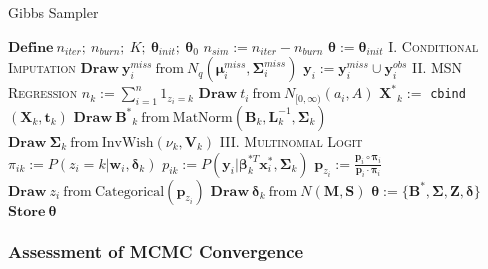 \documentclass[useAMS,referee]{biom}
\begin{document}
\begin{algorithm}
\caption{Gibbs Sampler}
\begin{algorithmic}
\small
\linespread{0.5}
    \State $\mathbf{Define} \ n_{iter};\  n_{burn}; \ K; \ \boldsymbol\theta_{init}; \ \boldsymbol\theta_0$
    \State $n_{sim} := n_{iter} - n_{burn}$
    \State $\boldsymbol\theta := \boldsymbol\theta_{init}$
        \State \textsc{I. Conditional Imputation}
            \State $\mathbf{Draw} \ \mathbf{y}_i^{miss} \ \text{from} \ N_q(\boldsymbol\mu_i^{miss}, \boldsymbol\Sigma_i^{miss})$
            \State $\mathbf{y}_i := \mathbf{y}_i^{miss} \cup \mathbf{y}_i^{obs}$
         \EndFor
        \State \textsc{II. MSN Regression}
            \State $n_k := \sum_{i = 1}^n {1}_{z_i = k}$
              \State $\mathbf{Draw}\  t_i \ \text{from} \ N_{[0,\infty)}(a_i,A)$
            \EndFor
            \State $\mathbf{X^*}_k := $ \texttt{cbind}$(\mathbf{X}_k,\mathbf{t}_k)$
            \State $\mathbf{Draw} \ \mathbf{B^*}_k \ \text{from} \ \text{MatNorm}(\mathbf{B}_k,\mathbf{L}_k^{-1},\boldsymbol\Sigma_k)$
            \State $\mathbf{Draw} \ \boldsymbol\Sigma_k \ \text{from} \ \text{InvWish}(\nu_k, \mathbf{V}_k)$
          \EndFor
        \State \textsc{III. Multinomial Logit}
              \State $\pi_{ik} := P(z_i = k|\mathbf{w}_i,\boldsymbol\delta_k)$
              \State $p_{ik} := P(\mathbf{y}_i|\boldsymbol\beta_k^{*T} \mathbf{x}^*_i,\boldsymbol\Sigma_k)$
            \EndFor
            \State $\mathbf{p}_{z_i} := \frac{\mathbf{p}_i \circ \boldsymbol\pi_i}{\mathbf{p}_i \cdot \boldsymbol\pi_i}$
            \State $\mathbf{Draw} \ z_i \ \text{from} \ \text{Categorical}(\mathbf{p}_{z_i})$
              \State $\mathbf{Draw} \ \boldsymbol\delta_k \ \text{from} \ N(\mathbf{M},\mathbf{S})$
            \EndFor
          \EndFor
        \State $\boldsymbol\theta := \{\mathbf{B^*}, \boldsymbol\Sigma, \mathbf{Z}, \boldsymbol\delta \}$
        \State $\mathbf{Store} \ \boldsymbol\theta$
	  \EndFor
\end{algorithmic}
\end{algorithm}


\subsubsection{Assessment of MCMC Convergence}
\end{document}
